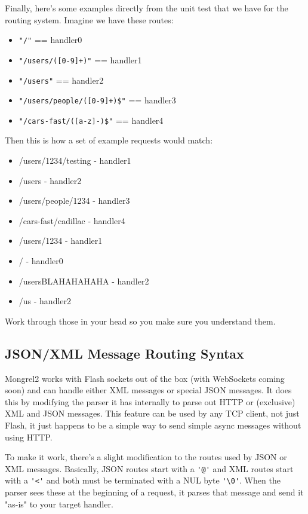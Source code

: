 Finally, here's some examples directly from the unit test that we have for
the routing system.  Imagine we have these routes:

\begin{itemize}
\item \verb|"/"| == handler0
\item \verb|"/users/([0-9]+)"| == handler1
\item \verb|"/users"| == handler2
\item \verb|"/users/people/([0-9]+)$"| == handler3
\item \verb|"/cars-fast/([a-z]-)$"| == handler4
\end{itemize}

Then this is how a set of example requests would match:

\begin{itemize}
\item /users/1234/testing - handler1
\item /users - handler2
\item /users/people/1234 - handler3
\item /cars-fast/cadillac - handler4
\item /users/1234 - handler1
\item / - handler0
\item /usersBLAHAHAHAHA - handler2
\item /us - handler2
\end{itemize}

Work through those in your head so you make sure you understand them.

\subsection{JSON/XML Message Routing Syntax}

Mongrel2 works with Flash sockets out of the box (with WebSockets coming soon)
and can handle either XML messages or special JSON messages.  It does this by
modifying the parser it has internally to parse out HTTP or (exclusive) XML
and JSON messages.  This feature can be used by any TCP client, not just Flash,
it just happens to be a simple way to send simple async messages without using HTTP.

To make it work, there's a slight modification to the routes used by
JSON or XML messages.  Basically, JSON routes start with a \verb|'@'| and XML routes
start with a \verb|'<'| and both must be terminated with a NUL byte \verb|'\0'|.  When the
parser sees these at the beginning of a request, it parses that message and
send it "as-is" to your target handler.

